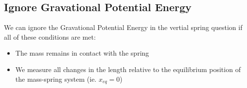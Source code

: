 \subsection{Ignore Gravational Potential Energy}
We can ignore the Gravational Potential Energy in the vertial spring question if all of these conditions are met:
\begin{itemize}
    \item The mass remains in contact with the spring
    \item We measure all changes in the length relative to the equilibrium position of the mass-spring system (ie. $x_{eq} = 0$)
\end{itemize}
